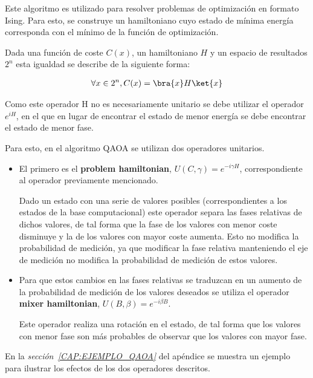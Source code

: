 Este algoritmo es utilizado para resolver problemas de optimización en formato Ising.  %
Para esto, se construye un hamiltoniano cuyo estado de mínima energía corresponda con el mínimo de la función de optimización.

Dada una función de coste $C(x)$, un hamiltoniano $H$ y un espacio de resultados $2^{n}$ esta igualdad se describe de la siguiente forma:

\begin{align*}
  \forall{x \in 2^{n}}, C(x) = \bra{x}H\ket{x}
\end{align*}

Como este operador H no es necesariamente unitario se debe utilizar el operador $e^{iH}$,  %
en el que en lugar de encontrar el estado de menor energía se debe encontrar el estado de menor fase.  %

Para esto, en el algoritmo QAOA se utilizan dos operadores unitarios.
\begin{itemize}
\item El primero es el \textbf{problem hamiltonian}, $U(C, \gamma) = e^{-i \gamma H}$, correspondiente al operador previamente mencionado.

  Dado un estado con una serie de valores posibles (correspondientes a los estados de la base computacional) este operador separa las fases relativas de dichos valores, de tal forma que la fase de los valores con menor coste disminuye y la de los valores con mayor coste aumenta. Esto no modifica la probabilidad de medición, ya que modificar la fase relativa manteniendo el eje de medición no modifica la probabilidad de medición de estos valores.

\item Para que estos cambios en las fases relativas se traduzcan en un aumento de la probabilidad de medición de los valores deseados se utiliza el operador \textbf{mixer hamiltonian}, $U(B, \beta) = e^{-i \beta B}$.

  Este operador realiza una rotación en el estado, de tal forma que los valores con menor fase son más probables de observar que los valores con mayor fase.

\end{itemize}

En la \textit{sección~\ref{CAP:EJEMPLO_QAOA}} del apéndice se muestra un ejemplo para ilustrar los efectos de los dos operadores descritos.



